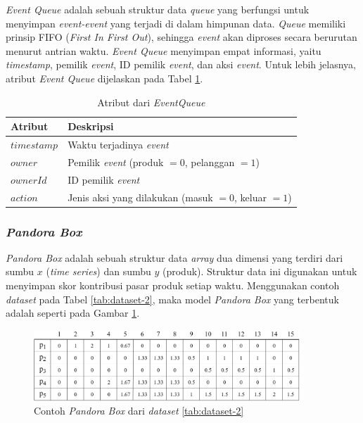 \textit{Event Queue} adalah sebuah struktur data \textit{queue} yang berfungsi untuk menyimpan \textit{event-event} yang terjadi di dalam himpunan data. \textit{Queue} memiliki prinsip FIFO (\textit{First In First Out}), sehingga \textit{event} akan diproses secara berurutan menurut antrian waktu. \textit{Event Queue} menyimpan empat informasi, yaitu \textit{timestamp}, pemilik \textit{event}, ID pemilik \textit{event}, dan aksi \textit{event}. Untuk lebih jelasnya, atribut \textit{Event Queue} dijelaskan pada Tabel \ref{tab:attr-event-queue}.


\begin{table}[H]
	\centering
	\begin{tabular}{|p{2cm}|p{6cm}|}
		\hline
		\textbf{Atribut} & \textbf{Deskripsi} \\ \hline \hline
		$timestamp$ & Waktu terjadinya \textit{event} \\ \hline
		$owner$ & Pemilik \textit{event} (produk $= 0$, pelanggan $= 1$) \\ \hline
		$ownerId$ & ID pemilik \textit{event}\\ \hline
		$action$ & Jenis aksi yang dilakukan (masuk $= 0$, keluar $= 1$) \\ \hline
	\end{tabular} 
	\caption{Atribut dari \textit{EventQueue}}
	\label{tab:attr-event-queue}
\end{table}

\subsubsection{\textit{Pandora Box}}
\tab \textit{Pandora Box} adalah sebuah struktur data \textit{array} dua dimensi yang terdiri dari sumbu $x$ (\textit{time series}) dan sumbu $y$ (produk). Struktur data ini digunakan untuk menyimpan skor kontribusi pasar produk setiap waktu. Menggunakan contoh \textit{dataset} pada Tabel \ref{tab:dataset-2}, maka model \textit{Pandora Box} yang terbentuk adalah seperti pada Gambar \ref{fig:pbox}.  

\begin{figure}[h]
	\centering
	\includegraphics[width=10cm]{assets/img/bab3/pbox.png}
	\caption{Contoh \textit{Pandora Box} dari \textit{dataset} \ref{tab:dataset-2}}
	\label{fig:pbox}
\end{figure}

